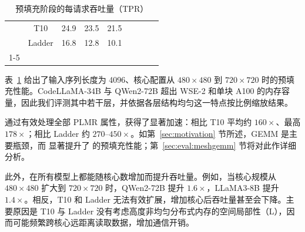\begin{table}[t]
{\begin{tabular}{c|c|ccclccc}
 & T10 & \multicolumn{1}{c|}{24.9} & \multicolumn{1}{c|}{23.5} & 21.5 & & \multicolumn{1}{c|}{} & \multicolumn{1}{c|}{} & \\
 & Ladder & \multicolumn{1}{c|}{16.8} & \multicolumn{1}{c|}{12.8} & 10.1 & & \multicolumn{1}{c|}{} & \multicolumn{1}{c|}{} & \\ \cline{1-5} \cline{7-9}
\end{tabular}%
}
  \caption{预填充阶段的每请求吞吐量（TPR）}
  \vspace{-0.2cm}
\label{tab:prefill_throughput}
\end{table}

 表~\ref{tab:prefill_throughput} 给出了输入序列长度为 4096、核心配置从 $480\times480$ 到 $720\times720$ 时的预填充性能。CodeLLaMA-34B 与 QWen2-72B 超出 WSE-2 和单块 A100 的内存容量，因此我们评测其中若干层，并依据各层结构均匀这一特点按比例缩放结果。

\sys 通过有效处理全部 PLMR 属性，获得了显著加速：相比 T10 平均约 $160\times$、最高 $178\times$；相比 Ladder 约 $270$--$450\times$。如第~\ref{sec:motivation} 节所述，GEMM 是主要瓶颈，而 \gemm 显著提升了 \sys 的预填充性能；第~\ref{sec:eval:meshgemm} 节将对此作详细分析。

此外，\sys 在所有模型上都能随核心数增加而提升吞吐量。例如，当核心规模从 $480\times480$ 扩大到 $720\times720$ 时，QWen2-72B 提升 $1.6\times$，LLaMA3-8B 提升 $1.4\times$。相反，T10 和 Ladder 无法有效扩展，增加核心后吞吐量甚至会下降。主要原因是 T10 与 Ladder 没有考虑高度非均匀分布式内存的空间局部性（L），因而可能频繁跨核心远距离读取数据，增加通信开销。

